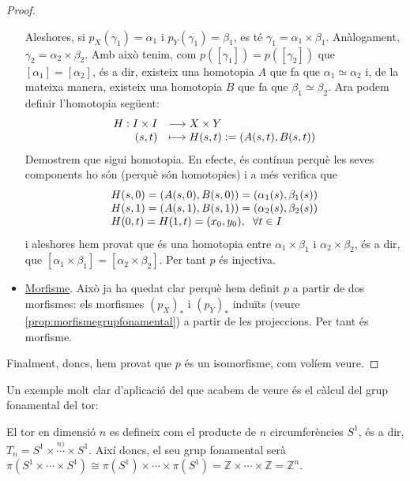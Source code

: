 \documentclass[../main.tex]{subfiles}
\begin{document}
\begin{proof}
\begin{itemize}
    Aleshores, si $p_X(\gamma_1) = \alpha_1$ i $p_Y(\gamma_1) = \beta_1$, es té $\gamma_1 = \alpha_1\times\beta_1$. Anàlogament, $\gamma_2 = \alpha_2\times\beta_2$. Amb això tenim, com $p([\gamma_1])=p([\gamma_2])$ que $[\alpha_1]=[\alpha_2]$, és a dir, existeix una homotopia $A$ que fa que $\alpha_1\simeq \alpha_2$ i, de la mateixa manera, existeix una homotopia $B$ que fa que $\beta_1\simeq\beta_2$. Ara podem definir l'homotopia següent:
    \begin{equation}
        \notag
        \begin{array}{rl}
            H:I\times I & \longrightarrow X\times Y \\
            (s,t) & \longmapsto H(s,t):=(A(s,t),B(s,t))
        \end{array}
    \end{equation}
    Demostrem que sigui homotopia. En efecte, és contínua perquè les seves components ho són (perquè són homotopies) i a més verifica que 
    \begin{equation}
        \notag
        \begin{array}{ll}
            H(s,0) = (A(s,0),B(s,0))=(\alpha_1(s),\beta_1(s)) \\
            H(s,1) = (A(s,1),B(s,1)) = (\alpha_2(s),\beta_2(s))\\
            H(0,t) = H(1,t) = (x_0,y_0),\;\;\forall t\in I
        \end{array}
    \end{equation}
    i aleshores hem provat que és una homotopia entre $\alpha_1\times \beta_1$ i $\alpha_2\times \beta_2$, és a dir, que $[\alpha_1\times\beta_1]=[\alpha_2\times\beta_2]$. Per tant $p$ és injectiva.
    \item \underline{Morfisme}. Això ja ha quedat clar perquè hem definit $p$ a partir de dos morfismes: els morfismes $(p_X)_*$ i $(p_Y)_*$ induïts (veure \ref{prop:morfismegrupfonamental}) a partir de les projeccions. Per tant és morfisme.
\end{itemize}
Finalment, doncs, hem provat que $p$ és un isomorfisme, com volíem veure.
\end{proof}

Un exemple molt clar d'aplicació del que acabem de veure és el càlcul del grup fonamental del tor:
\begin{ej}
[Exercici 5c]\label{exercici2.5.c} El tor en dimensió $n$ es defineix com el producte de $n$ circumferències $S^1$, és a dir, $T_n = S^1\times\overset{n)}{\cdots}\times S^1$. Així doncs, el seu grup fonamental serà $\pi(S^1\times\cdots\times S^1)\cong \pi(S^1)\times\cdots\times \pi(S^1) = \mathbb{Z}\times\cdots\times\mathbb{Z} = \mathbb{Z}^n$.
\end{ej}
\end{document}
